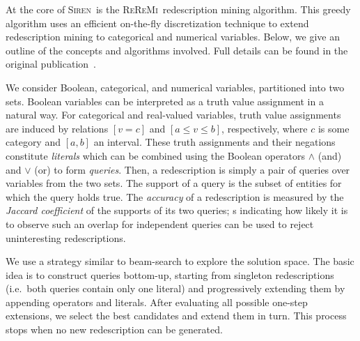 \documentclass{sig-alternate}
\newcommand{\Siren}{\textsc{Siren}}
\newcommand{\ReReMi}{\textsc{ReReMi}}
\begin{document}
At the core of \Siren\ is the \ReReMi\ redescription mining
algorithm. This greedy algorithm uses an efficient on-the-fly
discretization technique to extend redescription mining to categorical
and numerical variables.  Below, we give an outline of the concepts and
algorithms involved. Full details can be found
in the original publication~\cite{galbrun11black}.

We consider Boolean, categorical, and numerical variables, partitioned
into two sets. Boolean variables can be interpreted as a truth value
assignment in a natural way.  For categorical and real-valued
variables, truth value assignments are induced by relations $[v=c]$
and $[a \leq v \leq b]$, respectively, where $c$ is some category and
$[a, b]$ an interval.  These truth assignments and their negations
constitute \emph{literals} which can be combined using the Boolean
operators $\land$ (and) and $\lor$ (or) to form \emph{queries}.  Then,
a redescription is simply a pair of queries over variables from the
two sets.  The support of a query is the subset of entities for which
the query holds true.  The \emph{accuracy} of a redescription is
measured by the \emph{Jaccard coefficient} of the supports of its two
queries; \pValue{}s indicating how likely it is to observe such an
overlap for independent queries can be used to reject uninteresting
redescriptions.

We use a strategy similar to beam-search to explore the
solution space.  The basic idea is to construct queries bottom-up,
starting from singleton redescriptions (i.e.\ both queries contain
only one literal) and progressively extending them by appending
operators and literals. %
After evaluating all
possible one-step extensions, we select the best candidates and extend
them in turn. This process stops when no new redescription can
be generated.
\end{document}
